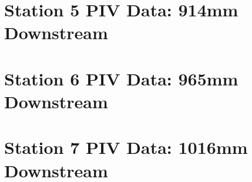 \chapter{Station 5 PIV Data: 914mm Downstream}












\chapter{Station 6 PIV Data: 965mm Downstream}












\chapter{Station 7 PIV Data: 1016mm Downstream}










